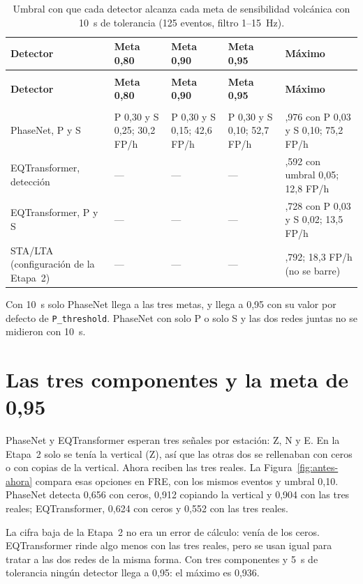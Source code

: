 \documentclass[11pt,a4paper,oneside,spanish,oldfontcommands]{memoir}
\newcommand{\cabecera}[2]{%
  \toprule #1 \\ \midrule \endfirsthead
  \multicolumn{#2}{l}{\itshape Cuadro \thetable{} (continuación)}\\
  \toprule #1 \\ \midrule \endhead
  \midrule \multicolumn{#2}{r}{\itshape Continúa en la página siguiente}\\ \endfoot
  \bottomrule \endlastfoot}
\begin{document}
{\small
\setlength{\tabcolsep}{4pt}
\begin{longtable}{>{\raggedright\arraybackslash}p{3.6cm}>{\raggedright\arraybackslash}p{2.6cm}>{\raggedright\arraybackslash}p{2.6cm}>{\raggedright\arraybackslash}p{2.6cm}>{\raggedright\arraybackslash}p{3.0cm}}
\caption{Umbral con que cada detector alcanza cada meta de sensibilidad volcánica con 10~s de tolerancia (125 eventos, filtro 1--15~Hz).}\label{tab:metas-10}\\
\cabecera{\textbf{Detector} & \textbf{Meta 0,80} & \textbf{Meta 0,90} & \textbf{Meta 0,95} & \textbf{Máximo}}{5}
PhaseNet, P y S & P 0,30 y S 0,25; 30,2 FP/h & P 0,30 y S 0,15; 42,6 FP/h & P 0,30 y S 0,10; 52,7 FP/h & 0,976 con P 0,03 y S 0,10; 75,2 FP/h \\
EQTransformer, detección & --- & --- & --- & 0,592 con umbral 0,05; 12,8 FP/h \\
EQTransformer, P y S & --- & --- & --- & 0,728 con P 0,03 y S 0,02; 13,5 FP/h \\
STA/LTA (configuración de la Etapa~2) & --- & --- & --- & 0,792; 18,3 FP/h (no se barre) \\
\end{longtable}
}

Con 10~s solo PhaseNet llega a las tres metas, y llega a 0,95 con su valor por
defecto de \texttt{P\_threshold}. PhaseNet con solo P o solo S y las dos redes
juntas no se midieron con 10~s.

\section{Las tres componentes y la meta de 0,95}\label{sec:componentes}

PhaseNet y EQTransformer esperan tres señales por estación: Z, N y E. En la
Etapa~2 solo se tenía la vertical (Z), así que las otras dos se rellenaban con
ceros o con copias de la vertical. Ahora reciben las tres reales. La
Figura~\ref{fig:antes-ahora} compara esas opciones en FRE, con los mismos
eventos y umbral 0,10. PhaseNet detecta 0,656 con ceros, 0,912 copiando la
vertical y 0,904 con las tres reales; EQTransformer, 0,624 con ceros y 0,552 con
las tres reales.

La cifra baja de la Etapa~2 no era un error de cálculo: venía de los ceros.
EQTransformer rinde algo menos con las tres reales, pero se usan igual para
tratar a las dos redes de la misma forma. Con tres componentes y 5~s de
tolerancia ningún detector llega a 0,95: el máximo es 0,936.
\end{document}
